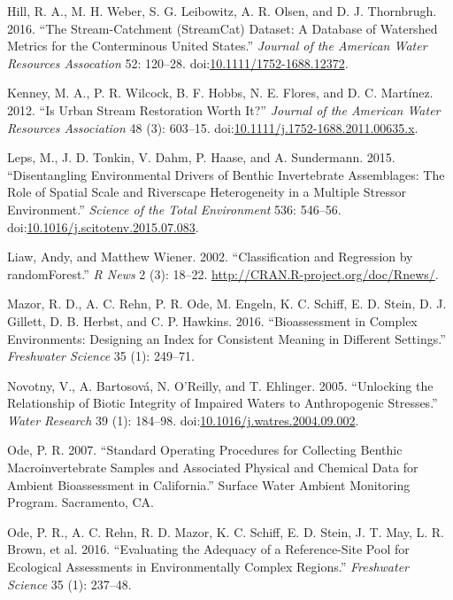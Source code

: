 \documentclass[]{article}
\begin{document}
\hypertarget{ref-Hill16}{}
Hill, R. A., M. H. Weber, S. G. Leibowitz, A. R. Olsen, and D. J.
Thornbrugh. 2016. ``The Stream-Catchment (StreamCat) Dataset: A Database
of Watershed Metrics for the Conterminous United States.'' \emph{Journal
of the American Water Resources Assocation} 52: 120--28.
doi:\href{https://doi.org/10.1111/1752-1688.12372}{10.1111/1752-1688.12372}.

\hypertarget{ref-Kenney12}{}
Kenney, M. A., P. R. Wilcock, B. F. Hobbs, N. E. Flores, and D. C.
Martínez. 2012. ``Is Urban Stream Restoration Worth It?'' \emph{Journal
of the American Water Resources Association} 48 (3): 603--15.
doi:\href{https://doi.org/10.1111/j.1752-1688.2011.00635.x}{10.1111/j.1752-1688.2011.00635.x}.

\hypertarget{ref-Leps15}{}
Leps, M., J. D. Tonkin, V. Dahm, P. Haase, and A. Sundermann. 2015.
``Disentangling Environmental Drivers of Benthic Invertebrate
Assemblages: The Role of Spatial Scale and Riverscape Heterogeneity in a
Multiple Stressor Environment.'' \emph{Science of the Total Environment}
536: 546--56.
doi:\href{https://doi.org/10.1016/j.scitotenv.2015.07.083}{10.1016/j.scitotenv.2015.07.083}.

\hypertarget{ref-Liaw02}{}
Liaw, Andy, and Matthew Wiener. 2002. ``Classification and Regression by
randomForest.'' \emph{R News} 2 (3): 18--22.
\url{http://CRAN.R-project.org/doc/Rnews/}.

\hypertarget{ref-Mazor16}{}
Mazor, R. D., A. C. Rehn, P. R. Ode, M. Engeln, K. C. Schiff, E. D.
Stein, D. J. Gillett, D. B. Herbst, and C. P. Hawkins. 2016.
``Bioassessment in Complex Environments: Designing an Index for
Consistent Meaning in Different Settings.'' \emph{Freshwater Science} 35
(1): 249--71.

\hypertarget{ref-Novotny05}{}
Novotny, V., A. Bartosová, N. O'Reilly, and T. Ehlinger. 2005.
``Unlocking the Relationship of Biotic Integrity of Impaired Waters to
Anthropogenic Stresses.'' \emph{Water Research} 39 (1): 184--98.
doi:\href{https://doi.org/10.1016/j.watres.2004.09.002}{10.1016/j.watres.2004.09.002}.

\hypertarget{ref-Ode07}{}
Ode, P. R. 2007. ``Standard Operating Procedures for Collecting Benthic
Macroinvertebrate Samples and Associated Physical and Chemical Data for
Ambient Bioassessment in California.'' Surface Water Ambient Monitoring
Program. Sacramento, CA.

\hypertarget{ref-Ode16}{}
Ode, P. R., A. C. Rehn, R. D. Mazor, K. C. Schiff, E. D. Stein, J. T.
May, L. R. Brown, et al. 2016. ``Evaluating the Adequacy of a
Reference-Site Pool for Ecological Assessments in Environmentally
Complex Regions.'' \emph{Freshwater Science} 35 (1): 237--48.
\end{document}
